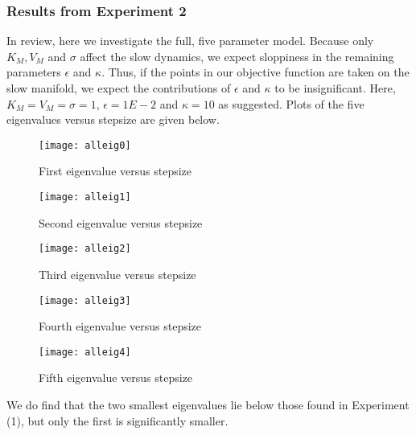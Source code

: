 \documentclass[11pt]{article}
\begin{document}
\subsubsection{Results from Experiment 2}
In review, here we investigate the full, five parameter model. Because only $K_M, V_M$ and $\sigma$ affect the slow dynamics, we expect sloppiness in the remaining parameters $\epsilon$ and $\kappa$. Thus, if the points in our objective function are taken on the slow manifold, we expect the contributions of $\epsilon$ and $\kappa$ to be insignificant. Here, $K_M =  V_M = \sigma = 1$, $\epsilon = 1E-2$ and $\kappa = 10$ as suggested. Plots of the five eigenvalues versus stepsize are given below.

\begin{figure}[h!]
  \centering
  \texttt{[image: alleig0]}
  \caption{First eigenvalue versus stepsize}
  \label{fig1}
\end{figure}

\begin{figure}[h!]
  \centering
  \texttt{[image: alleig1]}
  \caption{Second eigenvalue versus stepsize}
  \label{fig1}
\end{figure}

\begin{figure}[h!]
  \centering
  \texttt{[image: alleig2]}
  \caption{Third eigenvalue versus stepsize}
  \label{fig1}
\end{figure}

\begin{figure}[h!]
  \centering
  \texttt{[image: alleig3]}
  \caption{Fourth eigenvalue versus stepsize}
  \label{fig1}
\end{figure}

\begin{figure}[h!]
  \centering
  \texttt{[image: alleig4]}
  \caption{Fifth eigenvalue versus stepsize}
  \label{fig1}
\end{figure}

We do find that the two smallest eigenvalues lie below those found in Experiment (1), but only the first is significantly smaller.
\end{document}
